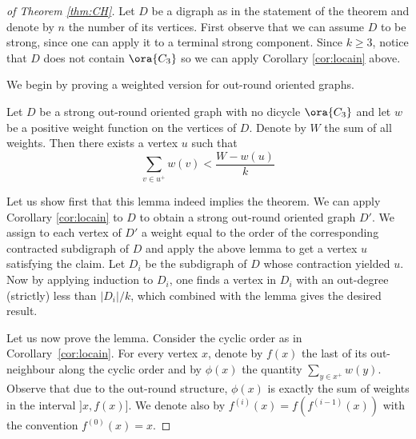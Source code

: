 \begin{proof}[of Theorem \ref{thm:CH}]
Let $D$ be a digraph as in the statement of the theorem and denote by $n$ the number of its vertices. First observe that we can assume $D$ to be strong, since one can apply it to a terminal strong component. Since $k\geq 3$, notice that $D$ does not contain $\ora{C_3}$ so we can apply Corollary \ref{cor:locain} above. 

We begin by proving a weighted version for out-round oriented graphs.

\begin{lemma}
Let $D$ be a strong out-round oriented graph with no dicycle $\ora{C_3}$ and let $w$ be a positive weight function on the vertices of $D$. Denote by $W$ the sum of all weights. Then there exists a vertex $u$ such that 
$$\sum_{v\in u^+} w(v) < \frac{W-w(u)}{k} $$
\end{lemma}

Let us show first that this lemma indeed implies the theorem. We can apply Corollary \ref{cor:locain} to $D$ to obtain a strong out-round oriented graph $D'$. We assign to each vertex of $D'$ a weight equal to the order of the corresponding contracted subdigraph of $D$ and apply the above lemma to get a vertex $u$ satisfying the claim. Let $D_i$ be the subdigraph of $D$ whose contraction yielded $u$. Now by applying induction to $D_i$, one finds a vertex in $D_i$ with an out-degree (strictly) less than $|D_i|/k$, which combined with the lemma gives the desired result.


Let us now prove the lemma. Consider the cyclic order as in Corollary~\ref{cor:locain}. For every vertex $x$, denote by $f(x)$ the last of its out-neighbour along the cyclic order and by $\phi(x)$ the quantity $\sum_{y\in x^+} w(y)$. Observe that due to the out-round structure, $\phi(x)$ is exactly the sum of weights in the interval $]x,f(x)]$. We denote also by $f^{(i)}(x)=f(f^{(i-1)}(x))$ with the convention $f^{(0)}(x)=x$.



\end{proof}
